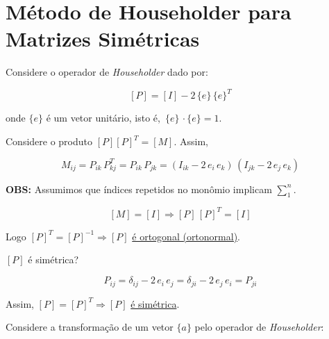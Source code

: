 \section{Método de Householder para Matrizes Simétricas}

Considere o operador de \textit{Householder} dado por:

\begin{equation}
\label{cap5:sec3:eq1}
[P] = [I] - 2 \, \{e\} \, \{e\}^T
\end{equation}

onde $ \{e\} $ é um vetor unitário, isto é, $ \, \{e\} \, \cdotp \{e\} = 1 $.

Considere o produto $ [P] [P]^T = [M] $. Assim,

\begin{equation}
\label{cap5:sec3:eq2}
 M_{ij} = P_{ik} \, P_{kj}^T = P_{ik} \, P_{jk} = (I_{ik} - 2 \, e_i \, e_k) \, (I_{jk} - 2 \, e_j \, e_k)
\end{equation}

\textbf{OBS:} Assumimos que índices repetidos no monômio implicam $ \displaystyle \sum_1^n $.


\begin{equation}
\label{cap5:sec3:eq3}
 [M] = [I] \Rightarrow [P] \, [P]^T = [I]
\end{equation}

Logo $ [P]^T = [P]^{-1} \Rightarrow [P] $ \underline{é ortogonal (ortonormal)}.

$ [P] $ é simétrica?

\begin{equation}
 P_{ij} = \delta_{ij} - 2 \, e_i \, e_j = \delta_{ji} - 2 \, e_j \, e_i = P_{ji}
\end{equation}

Assim, $ [P] = [P]^T \Rightarrow [P] $ \underline{é simétrica}.

Considere a transformação de um vetor $ \{a\} $ pelo operador de \textit{Householder}:

